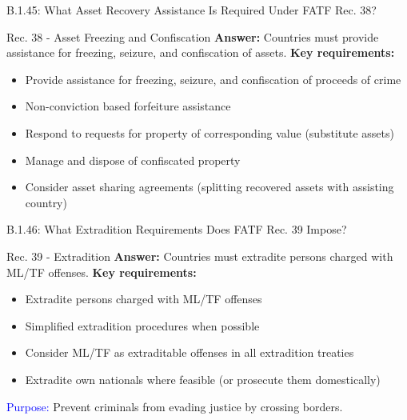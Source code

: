 \documentclass{beamer}
\begin{document}
	\begin{frame}{B.1.45: What Asset Recovery Assistance Is Required Under FATF Rec. 38?}
		\begin{block}{Rec. 38 - Asset Freezing and Confiscation}
			\textbf{Answer:} Countries must provide assistance for freezing, seizure, and confiscation of assets.
			\vspace{0.2cm}
			\textbf{Key requirements:}
			\begin{itemize}
				\item Provide assistance for freezing, seizure, and confiscation of proceeds of crime
				\item Non-conviction based forfeiture assistance
				\item Respond to requests for property of corresponding value (substitute assets)
				\item Manage and dispose of confiscated property
				\item Consider asset sharing agreements (splitting recovered assets with assisting country)
			\end{itemize}
		\end{block}
	\end{frame}
	
	\begin{frame}{B.1.46: What Extradition Requirements Does FATF Rec. 39 Impose?}
		\begin{block}{Rec. 39 - Extradition}
			\textbf{Answer:} Countries must extradite persons charged with ML/TF offenses.
			\vspace{0.2cm}
			\textbf{Key requirements:}
			\begin{itemize}
				\item Extradite persons charged with ML/TF offenses
				\item Simplified extradition procedures when possible
				\item Consider ML/TF as extraditable offenses in all extradition treaties
				\item Extradite own nationals where feasible (or prosecute them domestically)
			\end{itemize}
			\textcolor{blue}{Purpose:} Prevent criminals from evading justice by crossing borders.
		\end{block}
	\end{frame}
	
\end{document}

